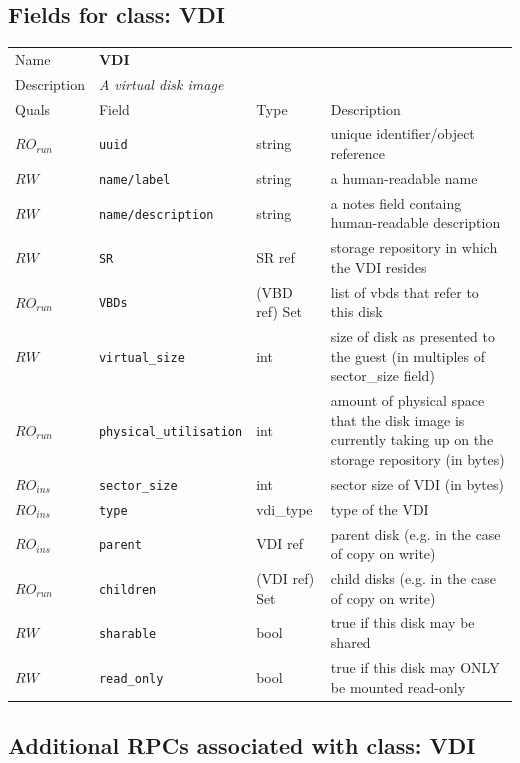 \subsection{Fields for class: VDI}
\begin{longtable}{|lllp{}|}
\hline
\multicolumn{1}{|l}{Name} & \multicolumn{3}{l|}{\bf VDI} \\
\multicolumn{1}{|l}{Description} & \multicolumn{3}{l|}{\parbox{11cm}{\em A virtual disk image}} \\
\hline
Quals & Field & Type & Description \\
\hline
$\mathit{RO}_\mathit{run}$ &  {\tt uuid} & string & unique identifier/object reference \\
$\mathit{RW}$ &  {\tt name/label} & string & a human-readable name \\
$\mathit{RW}$ &  {\tt name/description} & string & a notes field containg human-readable description \\
$\mathit{RW}$ &  {\tt SR} & SR ref & storage repository in which the VDI resides \\
$\mathit{RO}_\mathit{run}$ &  {\tt VBDs} & (VBD ref) Set & list of vbds that refer to this disk \\
$\mathit{RW}$ &  {\tt virtual\_size} & int & size of disk as presented to the guest (in multiples of sector\_size field) \\
$\mathit{RO}_\mathit{run}$ &  {\tt physical\_utilisation} & int & amount of physical space that the disk image is currently taking up on the storage repository (in bytes) \\
$\mathit{RO}_\mathit{ins}$ &  {\tt sector\_size} & int & sector size of VDI (in bytes) \\
$\mathit{RO}_\mathit{ins}$ &  {\tt type} & vdi\_type & type of the VDI \\
$\mathit{RO}_\mathit{ins}$ &  {\tt parent} & VDI ref & parent disk (e.g. in the case of copy on write) \\
$\mathit{RO}_\mathit{run}$ &  {\tt children} & (VDI ref) Set & child disks (e.g. in the case of copy on write) \\
$\mathit{RW}$ &  {\tt sharable} & bool & true if this disk may be shared \\
$\mathit{RW}$ &  {\tt read\_only} & bool & true if this disk may ONLY be mounted read-only \\
\hline
\end{longtable}
\subsection{Additional RPCs associated with class: VDI}
